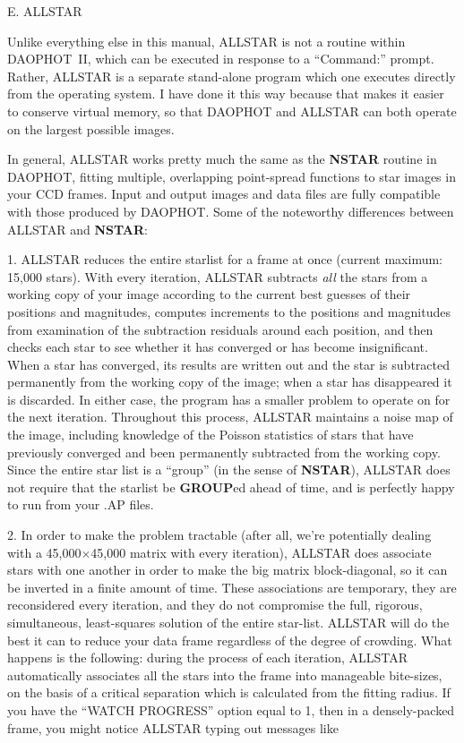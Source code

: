 \vfill
\eject
\centerline {E. ALLSTAR}

Unlike everything else in this manual, ALLSTAR is not a
routine within DAOPHOT~II, which can be executed in response to a
``Command:'' prompt.  Rather, ALLSTAR is a separate stand-alone
program which one executes directly from the operating system.  I
have done it this way because that makes it easier to conserve
virtual memory, so that DAOPHOT and ALLSTAR can both operate
on the largest possible images.

In general, ALLSTAR works pretty much the same as the {\bf NSTAR} 
routine in DAOPHOT, fitting multiple, overlapping point-spread functions
to star images in your CCD frames.  Input and output images and data 
files are fully compatible with those produced by DAOPHOT.  Some of 
the noteworthy differences between ALLSTAR and {\bf NSTAR}:

\item{1.} ALLSTAR reduces the entire starlist for a frame at once
(current maximum: 15,000 stars).  With every iteration, ALLSTAR
subtracts {\it all\/} the stars from a working copy of your image
according to the current best guesses of their positions and
magnitudes, computes increments to the positions and magnitudes from
examination of the subtraction residuals around each position, and then
checks each star to see whether it has converged or has become
insignificant.  When a star has converged, its results are written out
and the star is subtracted permanently from the working copy of the
image; when a star has disappeared it is discarded.  In either case,
the program has a smaller problem to operate on for the next
iteration.  Throughout this process, ALLSTAR maintains a noise map of
the image, including knowledge of the Poisson statistics of stars that
have previously converged and been permanently subtracted from the
working copy.  Since the entire star list is a ``group'' (in the sense
of {\bf NSTAR}), ALLSTAR does not require that the starlist be {\bf
GROUP}ed ahead of time, and is perfectly happy to run from your
.AP files.

\item{2.} In order to make the problem tractable (after all, we're
potentially dealing with a 45,000$\times$45,000 matrix with every
iteration), ALLSTAR does associate stars with one another in
order to make the big matrix block-diagonal, so it can be inverted in a
finite amount of time.  These associations are temporary, they are
reconsidered every iteration, and they do not compromise the full,
rigorous, simultaneous, least-squares solution of the entire
star-list.  ALLSTAR will do the best it can to reduce your data
frame regardless of the degree of crowding.  What happens is the
following:  during the process of each iteration, ALLSTAR automatically
associates all the stars into the frame into manageable bite-sizes, on
the basis of a critical separation which is calculated from the fitting
radius.  If you have the ``WATCH PROGRESS'' option equal to 1, then in
a densely-packed frame, you might notice ALLSTAR typing out messages
like

